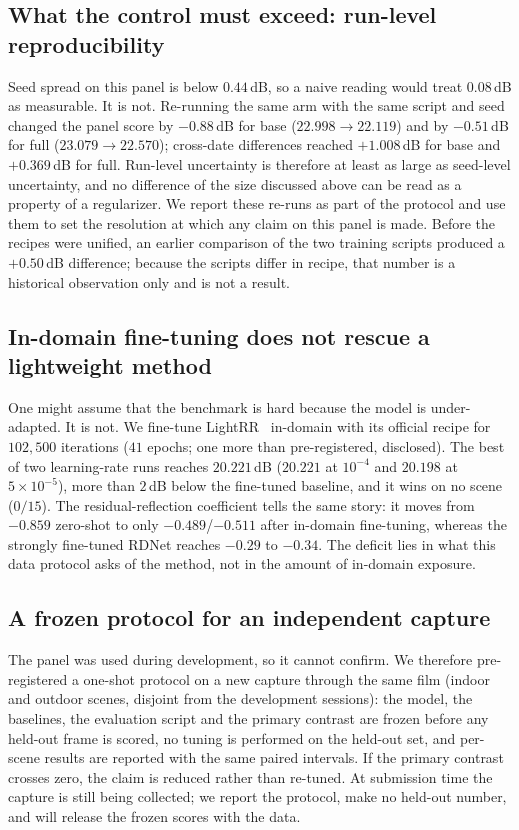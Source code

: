\subsection{What the control must exceed: run-level reproducibility}
\label{sec:runlevel}
Seed spread on this panel is below $0.44$\,dB, so a naive reading would treat
$0.08$\,dB as measurable. It is not. Re-running the same arm with the same
script and seed changed the panel score by $-0.88$\,dB for base
($22.998\rightarrow22.119$) and by $-0.51$\,dB for full
($23.079\rightarrow22.570$); cross-date differences reached $+1.008$\,dB for
base and $+0.369$\,dB for full. Run-level uncertainty is therefore at least as
large as seed-level uncertainty, and no difference of the size discussed above
can be read as a property of a regularizer. We report these re-runs as part of
the protocol and use them to set the resolution at which any claim on this
panel is made. Before the recipes were unified, an earlier comparison of the
two training scripts produced a $+0.50$\,dB difference; because the scripts
differ in recipe, that number is a historical observation only and is not a
result.

\subsection{In-domain fine-tuning does not rescue a lightweight method}
\label{sec:lightrr}
One might assume that the benchmark is hard because the model is
under-adapted. It is not. We fine-tune LightRR~\cite{yin2026lightrr} in-domain
with its official recipe for $102{,}500$ iterations ($41$ epochs; one more than
pre-registered, disclosed). The best of two learning-rate runs reaches
$20.221$\,dB ($20.221$ at $10^{-4}$ and $20.198$ at $5\times10^{-5}$), more
than $2$\,dB below the fine-tuned baseline, and it wins on no scene ($0/15$).
The residual-reflection coefficient tells the same story: it moves from
$-0.859$ zero-shot to only $-0.489$/$-0.511$ after in-domain fine-tuning,
whereas the strongly fine-tuned RDNet reaches $-0.29$ to $-0.34$. The deficit
lies in what this data protocol asks of the method, not in the amount of
in-domain exposure.

\subsection{A frozen protocol for an independent capture}
\label{sec:heldout}
The panel was used during development, so it cannot confirm. We therefore
pre-registered a one-shot protocol on a new capture through the same film
(indoor and outdoor scenes, disjoint from the development sessions): the model,
the baselines, the evaluation script and the primary contrast are frozen before
any held-out frame is scored, no tuning is performed on the held-out set, and
per-scene results are reported with the same paired intervals. If the primary
contrast crosses zero, the claim is reduced rather than re-tuned. At submission
time the capture is still being collected; we report the protocol, make no
held-out number, and will release the frozen scores with the data.


